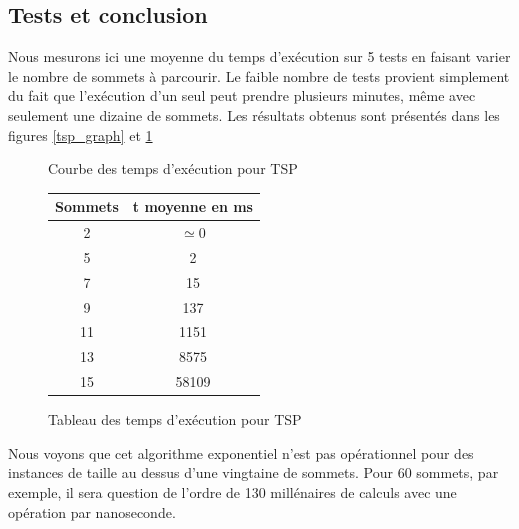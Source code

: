  

\subsection{Tests et conclusion}
Nous mesurons ici une moyenne du temps d'exécution sur 5 tests en
faisant varier le nombre de sommets à parcourir. Le faible nombre de
tests provient simplement du fait que l'exécution d'un seul peut
prendre plusieurs minutes, même avec seulement une dizaine de
sommets. Les résultats obtenus sont présentés dans les figures
\ref{tsp_graph} et \ref{tsp_table}

\begin{figure}[ht]
\begin{minipage}[b]{0.5\linewidth}
\centering
{}
\caption {Courbe des temps d'exécution pour TSP}
\label{tsp_graph}
\end{minipage}
\hspace{0.5cm}
\begin{minipage}[b]{0.5\linewidth}
\centering
\begin{tabular}{|c|c|}
\hline
Sommets & t moyenne en ms\\
\hline
2 & $\simeq 0$\\
\hline
5 & 2\\
\hline
7 & 15\\
\hline
9 & 137\\
\hline
11 & 1151\\
\hline
13 & 8575\\
\hline
15 & 58109\\
\hline
\end{tabular}
\caption {Tableau des temps d'exécution pour TSP}
\label{tsp_table}
\end{minipage}
\end{figure}

Nous voyons que cet algorithme exponentiel n'est pas opérationnel pour
des instances de taille au dessus d'une vingtaine de sommets. Pour 60 sommets,
par exemple, il sera question de l'ordre de 130 millénaires de calculs
avec une opération par nanoseconde.

